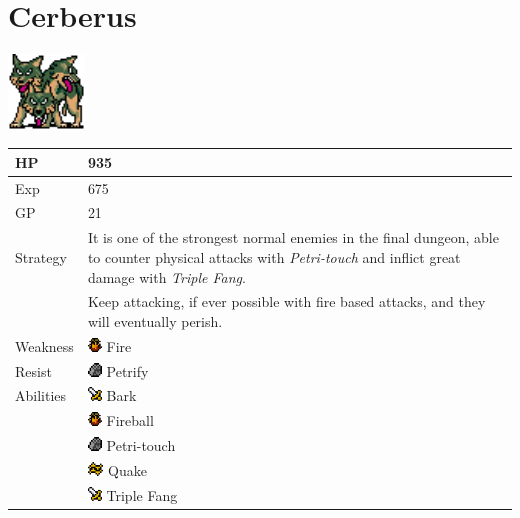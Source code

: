 \section{Cerberus}
\label{monster:cerberus}

\includegraphics[height=2cm,keepaspectratio]{./resources/monster/cerberus}

\begin{longtable}{ l p{9cm} }
	HP
	& 935
\\ \hline
	Exp
	& 675
\\ \hline
	GP
	& 21
\\ \hline
	Strategy
	& It is one of the strongest normal enemies in the final dungeon, able to counter physical attacks with \textit{Petri-touch} and inflict great damage with \textit{Triple Fang}. \\
	& Keep attacking, if ever possible with fire based attacks, and they will eventually perish.
\\ \hline
	Weakness
	& \includegraphics[height=1em,keepaspectratio]{./resources/effects/fire} Fire
\\ \hline
	Resist
	& \includegraphics[height=1em,keepaspectratio]{./resources/effects/petrify} Petrify
\\ \hline
	Abilities
	& \includegraphics[height=1em,keepaspectratio]{./resources/effects/damage} Bark \\
	& \includegraphics[height=1em,keepaspectratio]{./resources/effects/fire} Fireball \\
	& \includegraphics[height=1em,keepaspectratio]{./resources/effects/petrify} Petri-touch \\
	& \includegraphics[height=1em,keepaspectratio]{./resources/effects/earth} Quake \\
	& \includegraphics[height=1em,keepaspectratio]{./resources/effects/damage} Triple Fang
\end{longtable}
